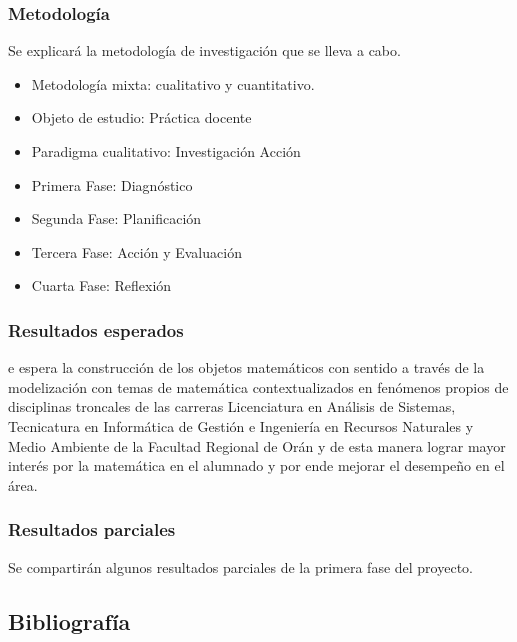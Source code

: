 \subsubsection{Metodología}

Se explicará la metodología de investigación que se lleva a cabo.

\begin{itemize}
	\item Metodología mixta: cualitativo y cuantitativo.
	\item Objeto de estudio: Práctica docente
	\item Paradigma cualitativo: Investigación Acción
	\item Primera Fase: Diagnóstico
	\item Segunda Fase: Planificación
	\item Tercera Fase: Acción y Evaluación
	\item Cuarta Fase: Reflexión
\end{itemize}

\subsubsection{Resultados esperados}

e espera la construcción de los objetos matemáticos con sentido a través de la modelización con temas de matemática contextualizados en fenómenos propios de disciplinas troncales de las carreras Licenciatura en Análisis de Sistemas, Tecnicatura en Informática de Gestión e Ingeniería en Recursos Naturales y Medio Ambiente de la Facultad Regional de Orán y de esta manera lograr mayor interés por la matemática en el alumnado y por ende mejorar el desempeño en el área.

\subsubsection{Resultados parciales}

Se compartirán algunos resultados parciales de la primera fase del proyecto.

\subsection{Bibliografía}

\nocite{*}
\printbibliography[keyword={11}]